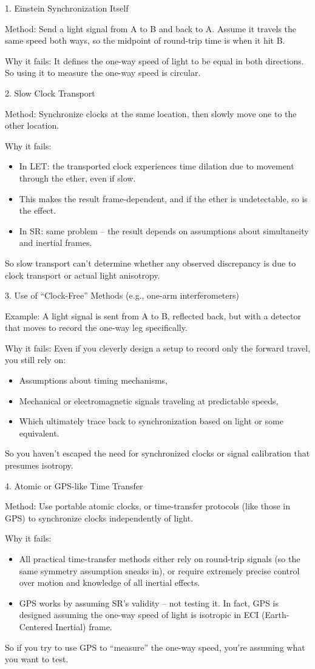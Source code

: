 \documentclass[a4paper]{article}
\theoremstyle{plain}
\theoremstyle{definition}
\begin{document}
1. Einstein Synchronization Itself

Method: Send a light signal from A to B and back to A.  Assume it
travels the same speed both ways, so the midpoint of round-trip time
is when it hit B.

Why it fails: It defines the one-way speed of light to be equal in
both directions.  So using it to measure the one-way speed is
circular.

2. Slow Clock Transport

Method: Synchronize clocks at the same location, then slowly move one
to the other location.

Why it fails:
\begin{itemize}
\item In LET: the transported clock experiences time dilation due to
  movement through the ether, even if slow.
\item This makes the result frame-dependent, and if the ether is
  undetectable, so is the effect.
\item In SR: same problem -- the result depends on assumptions about
  simultaneity and inertial frames.
\end{itemize}
So slow transport can't determine whether any observed discrepancy is
due to clock transport or actual light anisotropy.

3. Use of ``Clock-Free'' Methods (e.g., one-arm interferometers)

Example: A light signal is sent from A to B, reflected back, but with
a detector that moves to record the one-way leg specifically.

Why it fails: Even if you cleverly design a setup to record only the
forward travel, you still rely on:
\begin{itemize}
\item Assumptions about timing mechanisms,
\item Mechanical or electromagnetic signals traveling at predictable
  speeds,
\item Which ultimately trace back to synchronization based on light or
  some equivalent.
\end{itemize}
So you haven't escaped the need for synchronized clocks or signal
calibration that presumes isotropy.

4. Atomic or GPS-like Time Transfer

Method: Use portable atomic clocks, or time-transfer protocols (like
those in GPS) to synchronize clocks independently of light.

Why it fails:
\begin{itemize}
\item All practical time-transfer methods either rely on round-trip
  signals (so the same symmetry assumption sneaks in), or require
  extremely precise control over motion and knowledge of all inertial
  effects.
\item GPS works by assuming SR's validity -- not testing it.  In fact,
  GPS is designed assuming the one-way speed of light is isotropic in
  ECI (Earth-Centered Inertial) frame.
\end{itemize}
So if you try to use GPS to ``measure'' the one-way speed, you're
assuming what you want to test.
\end{document}
